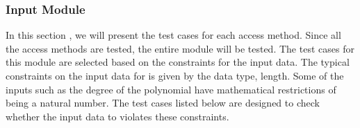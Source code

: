 \documentclass[12pt, titlepage]{article}
\begin{document}
\subsubsection {Input Module}

In this section , we will present the test cases for each access method. Since 
all the access methods are tested, the entire module will be tested. The test 
cases for this module are selected based on the constraints for the input data. 
The typical constraints on the input data for \famname{} is given by the data 
type, length. Some of the inputs such as the degree of the polynomial have 
mathematical restrictions of being a natural number. The test cases listed 
below are designed to check whether the input data to \famname{} violates these 
constraints.  
\end{document}
